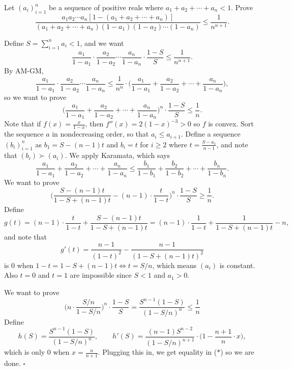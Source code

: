 
\begin{problem}[ISL 1998 A1]
    Let $(a_i)_{i=1}^n$ be a sequence of positive reals where $a_1+a_2+\cdots +a_n<1$. Prove
    \[\frac{a_1 a_2 \cdots a_n [1 - (a_1 + a_2 + \cdots + a_n)]}{(a_1 + a_2 + \cdots + a_n)(1 - a_1)(1 - a_2) \cdots (1 - a_n)} \leq \frac{1}{n^{n+1}}.\]
\end{problem}

\begin{solution}
    Define $S = \sum_{i=1}^n a_i < 1$, and we want
    \[\frac{a_1}{1-a_1} \cdot \frac{a_2}{1-a_2} \cdots \frac{a_n}{1-a_n} \cdot \frac{1-S}{S} \leq \frac{1}{n^{n+1}}.\]
    By AM-GM,
    \[\frac{a_1}{1-a_1} \cdot \frac{a_2}{1-a_2} \cdots \frac{a_n}{1-a_n} \leq \frac{1}{n^n} \cdot \bigg(\frac{a_1}{1-a_1} + \frac{a_2}{1-a_2} + \cdots + \frac{a_n}{1-a_n}\bigg),\]
    so we want to prove
    \[\bigg(\frac{a_1}{1-a_1} + \frac{a_2}{1-a_2} + \cdots + \frac{a_n}{1-a_n}\bigg)^n \cdot \frac{1-S}{S} \leq \frac1n.\]
    Note that if $f(x) = \tfrac{x}{1-x}$, then $f''(x) = 2(1-x)^{-3} > 0$ so $f$ is convex. Sort the sequence $a$ in nondecreasing order, so that $a_i \leq a_{i+1}$. Define a sequence $(b_i)_{i=1}^n$ as $b_1 = S-(n-1)t$ and $b_i = t$ for $i \geq 2$ where $t = \tfrac{S-a_1}{n-1}$, and note that $(b_i) \succ (a_i)$. We apply Karamata, which says
    \[\frac{a_1}{1-a_1} + \frac{a_2}{1-a_2} + \cdots + \frac{a_n}{1-a_n} \leq \frac{b_1}{1-b_1} + \frac{b_2}{1-b_2} + \cdots + \frac{b_n}{1-b_n}.\]
    We want to prove
    \[\bigg(\frac{S-(n-1)t}{1-S+(n-1)t} - (n-1) \cdot \frac{t}{1-t}\bigg)^n \cdot \frac{1-S}{S} \geq \frac1n.\]
    Define
    \[g(t) = (n-1) \cdot \frac{t}{1-t} + \frac{S-(n-1)t}{1-S+(n-1)t} = (n-1) \cdot \frac{1}{1-t} + \frac{1}{1-S+(n-1)t} - n,\]
    and note that
    \[g'(t) = \frac{n-1}{(1-t)^2} - \frac{n-1}{(1-S+(n-1)t)^2}\]
    is $0$ when $1-t = 1-S+(n-1)t \Longleftrightarrow t = S/n$, which means $(a_i)$ is constant. Also $t=0$ and $t=1$ are impossible since $S < 1$ and $a_1 > 0$.
    
    We want to prove
    \[\bigg(n \cdot \frac{S/n}{1-S/n}\bigg)^n \cdot \frac{1-S}{S} = \frac{S^{n-1}(1-S)}{(1-S/n)^n} \leq \frac1n \tag{$*$}\]
    Define
    \[h(S) = \frac{S^{n-1}(1-S)}{(1-S/n)^n}, \qquad h'(S) = \frac{(n-1)S^{n-2}}{(1-S/n)^{n+1}} \cdot \bigg(1 - \frac{n+1}{n} \cdot x\bigg),\]
    which is only $0$ when $x = \tfrac{n}{n+1}$. Plugging this in, we get equality in ($*$) so we are done. $\square$
\end{solution}